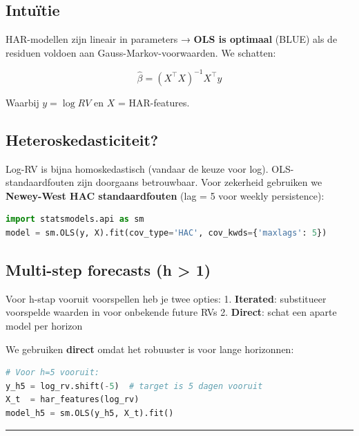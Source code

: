 \documentclass[11pt,a4paper]{article}
\begin{document}
\hypertarget{intuuxeftie-4}{%
\subsection{Intuïtie}\label{intuuxeftie-4}}

HAR-modellen zijn lineair in parameters → \textbf{OLS is optimaal} (BLUE) als de residuen voldoen aan Gauss-Markov-voorwaarden. We schatten:

\[\hat\beta = (X^\top X)^{-1} X^\top y\]

Waarbij \(y = \log RV\) en \(X\) = HAR-features.

\hypertarget{heteroskedasticiteit}{%
\subsection{Heteroskedasticiteit?}\label{heteroskedasticiteit}}

Log-RV is bijna homoskedastisch (vandaar de keuze voor log). OLS-standaardfouten zijn doorgaans betrouwbaar. Voor zekerheid gebruiken we \textbf{Newey-West HAC standaardfouten} (lag = 5 voor weekly persistence):

\begin{lstlisting}[language=Python]
import statsmodels.api as sm
model = sm.OLS(y, X).fit(cov_type='HAC', cov_kwds={'maxlags': 5})
\end{lstlisting}

\hypertarget{multi-step-forecasts-h-1}{%
\subsection{Multi-step forecasts (h \textgreater{} 1)}\label{multi-step-forecasts-h-1}}

Voor h-stap vooruit voorspellen heb je twee opties:
1. \textbf{Iterated}: substitueer voorspelde waarden in voor onbekende future RVs
2. \textbf{Direct}: schat een aparte model per horizon

We gebruiken \textbf{direct} omdat het robuuster is voor lange horizonnen:

\begin{lstlisting}[language=Python]
# Voor h=5 vooruit:
y_h5 = log_rv.shift(-5)  # target is 5 dagen vooruit
X_t  = har_features(log_rv)
model_h5 = sm.OLS(y_h5, X_t).fit()
\end{lstlisting}

\begin{center}\rule{0.5\linewidth}{0.5pt}\end{center}
\end{document}
